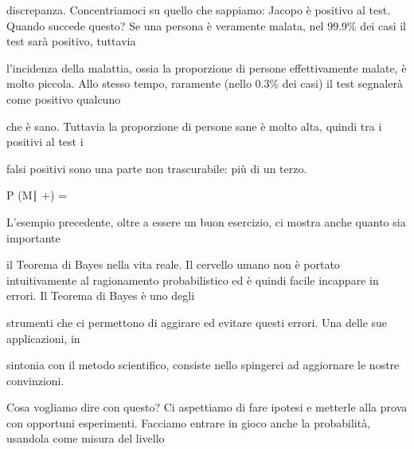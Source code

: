 \documentclass[a4paper,portrait,12pt]{article}
\begin{document}
\begin{flushleft}
discrepanza. Concentriamoci su quello che sappiamo: Jacopo \`{e} positivo al test. Quando succede questo? Se una persona \`{e} veramente malata, nel 99.9\% dei casi il test sar\`{a} positivo, tuttavia
\end{flushleft}


\begin{flushleft}
l'incidenza della malattia, ossia la proporzione di persone effettivamente malate, \`{e} molto piccola. Allo stesso tempo, raramente (nello 0.3\% dei casi) il test segnaler\`{a} come positivo qualcuno
\end{flushleft}


\begin{flushleft}
che \`{e} sano. Tuttavia la proporzione di persone sane \`{e} molto alta, quindi tra i positivi al test i
\end{flushleft}


\begin{flushleft}
falsi positivi sono una parte non trascurabile: più di un terzo.
\end{flushleft}


\begin{flushleft}
P (M∣ +) =
\end{flushleft}





\begin{flushleft}
L'esempio precedente, oltre a essere un buon esercizio, ci mostra anche quanto sia importante
\end{flushleft}


\begin{flushleft}
il Teorema di Bayes nella vita reale. Il cervello umano non \`{e} portato intuitivamente al ragionamento probabilistico ed \`{e} quindi facile incappare in errori. Il Teorema di Bayes \`{e} uno degli
\end{flushleft}


\begin{flushleft}
strumenti che ci permettono di aggirare ed evitare questi errori. Una delle sue applicazioni, in
\end{flushleft}


\begin{flushleft}
sintonia con il metodo scientifico, consiste nello spingerci ad aggiornare le nostre convinzioni.
\end{flushleft}


\begin{flushleft}
Cosa vogliamo dire con questo? Ci aspettiamo di fare ipotesi e metterle alla prova con opportuni esperimenti. Facciamo entrare in gioco anche la probabilit\`{a}, usandola come misura del livello
\end{flushleft}
\end{document}
